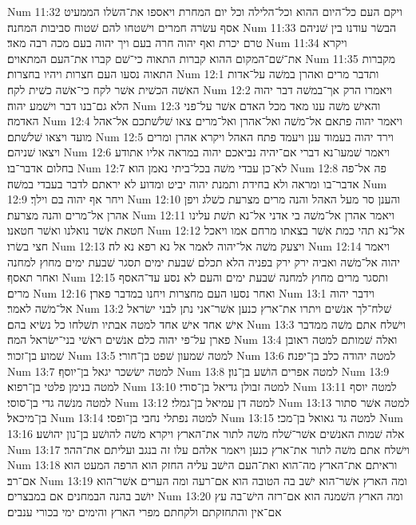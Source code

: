 Num 11:32  ויקם העם כל־היום ההוא וכל־הלילה וכל יום המחרת ויאספו את־השׂלו הממעיט אסף עשׂרה חמרים וישׁטחו להם שׁטוח סביבות המחנה׃
Num 11:33  הבשׂר עודנו בין שׁניהם טרם יכרת ואף יהוה חרה בעם ויך יהוה בעם מכה רבה מאד׃
Num 11:34  ויקרא את־שׁם־המקום ההוא קברות התאוה כי־שׁם קברו את־העם המתאוים׃
Num 11:35  מקברות התאוה נסעו העם חצרות ויהיו בחצרות׃
Num 12:1  ותדבר מרים ואהרן במשׁה על־אדות האשׁה הכשׁית אשׁר לקח כי־אשׁה כשׁית לקח׃
Num 12:2  ויאמרו הרק אך־במשׁה דבר יהוה הלא גם־בנו דבר וישׁמע יהוה׃
Num 12:3  והאישׁ משׁה ענו מאד מכל האדם אשׁר על־פני האדמה׃
Num 12:4  ויאמר יהוה פתאם אל־משׁה ואל־אהרן ואל־מרים צאו שׁלשׁתכם אל־אהל מועד ויצאו שׁלשׁתם׃
Num 12:5  וירד יהוה בעמוד ענן ויעמד פתח האהל ויקרא אהרן ומרים ויצאו שׁניהם׃
Num 12:6  ויאמר שׁמעו־נא דברי אם־יהיה נביאכם יהוה במראה אליו אתודע בחלום אדבר־בו׃
Num 12:7  לא־כן עבדי משׁה בכל־ביתי נאמן הוא׃
Num 12:8  פה אל־פה אדבר־בו ומראה ולא בחידת ותמנת יהוה יביט ומדוע לא יראתם לדבר בעבדי במשׁה׃
Num 12:9  ויחר אף יהוה בם וילך׃
Num 12:10  והענן סר מעל האהל והנה מרים מצרעת כשׁלג ויפן אהרן אל־מרים והנה מצרעת׃
Num 12:11  ויאמר אהרן אל־משׁה בי אדני אל־נא תשׁת עלינו חטאת אשׁר נואלנו ואשׁר חטאנו׃
Num 12:12  אל־נא תהי כמת אשׁר בצאתו מרחם אמו ויאכל חצי בשׂרו׃
Num 12:13  ויצעק משׁה אל־יהוה לאמר אל נא רפא נא לה׃
Num 12:14  ויאמר יהוה אל־משׁה ואביה ירק ירק בפניה הלא תכלם שׁבעת ימים תסגר שׁבעת ימים מחוץ למחנה ואחר תאסף׃
Num 12:15  ותסגר מרים מחוץ למחנה שׁבעת ימים והעם לא נסע עד־האסף מרים׃
Num 12:16  ואחר נסעו העם מחצרות ויחנו במדבר פארן׃
Num 13:1  וידבר יהוה אל־משׁה לאמר׃
Num 13:2  שׁלח־לך אנשׁים ויתרו את־ארץ כנען אשׁר־אני נתן לבני ישׂראל אישׁ אחד אישׁ אחד למטה אבתיו תשׁלחו כל נשׂיא בהם׃
Num 13:3  וישׁלח אתם משׁה ממדבר פארן על־פי יהוה כלם אנשׁים ראשׁי בני־ישׂראל המה׃
Num 13:4  ואלה שׁמותם למטה ראובן שׁמוע בן־זכור׃
Num 13:5  למטה שׁמעון שׁפט בן־חורי׃
Num 13:6  למטה יהודה כלב בן־יפנה׃
Num 13:7  למטה ישׂשכר יגאל בן־יוסף׃
Num 13:8  למטה אפרים הושׁע בן־נון׃
Num 13:9  למטה בנימן פלטי בן־רפוא׃
Num 13:10  למטה זבולן גדיאל בן־סודי׃
Num 13:11  למטה יוסף למטה מנשׁה גדי בן־סוסי׃
Num 13:12  למטה דן עמיאל בן־גמלי׃
Num 13:13  למטה אשׁר סתור בן־מיכאל׃
Num 13:14  למטה נפתלי נחבי בן־ופסי׃
Num 13:15  למטה גד גאואל בן־מכי׃
Num 13:16  אלה שׁמות האנשׁים אשׁר־שׁלח משׁה לתור את־הארץ ויקרא משׁה להושׁע בן־נון יהושׁע׃
Num 13:17  וישׁלח אתם משׁה לתור את־ארץ כנען ויאמר אלהם עלו זה בנגב ועליתם את־ההר׃
Num 13:18  וראיתם את־הארץ מה־הוא ואת־העם הישׁב עליה החזק הוא הרפה המעט הוא אם־רב׃
Num 13:19  ומה הארץ אשׁר־הוא ישׁב בה הטובה הוא אם־רעה ומה הערים אשׁר־הוא יושׁב בהנה הבמחנים אם במבצרים׃
Num 13:20  ומה הארץ השׁמנה הוא אם־רזה הישׁ־בה עץ אם־אין והתחזקתם ולקחתם מפרי הארץ והימים ימי בכורי ענבים׃
